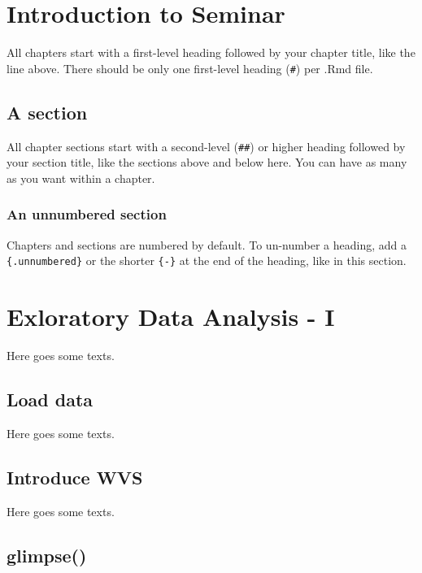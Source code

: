 \documentclass[
]{book}
\begin{document}
\hypertarget{intro-sem}{%
\chapter{Introduction to Seminar}\label{intro-sem}}

All chapters start with a first-level heading followed by your chapter title, like the line above. There should be only one first-level heading (\texttt{\#}) per .Rmd file.

\hypertarget{a-section}{%
\section{A section}\label{a-section}}

All chapter sections start with a second-level (\texttt{\#\#}) or higher heading followed by your section title, like the sections above and below here. You can have as many as you want within a chapter.

\hypertarget{an-unnumbered-section}{%
\subsection*{An unnumbered section}\label{an-unnumbered-section}}

Chapters and sections are numbered by default. To un-number a heading, add a \texttt{\{.unnumbered\}} or the shorter \texttt{\{-\}} at the end of the heading, like in this section.

\hypertarget{eda-1}{%
\chapter{Exloratory Data Analysis - I}\label{eda-1}}

Here goes some texts.

\hypertarget{load-data}{%
\section{Load data}\label{load-data}}

Here goes some texts.

\hypertarget{introduce-wvs}{%
\section{Introduce WVS}\label{introduce-wvs}}

Here goes some texts.

\hypertarget{glimpse}{%
\section{glimpse()}\label{glimpse}}
\end{document}
